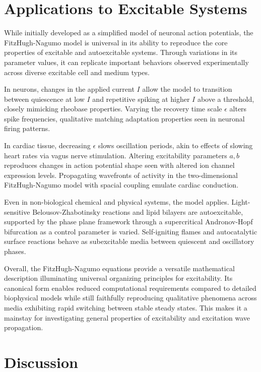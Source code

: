 \section{Applications to Excitable Systems}

While initially developed as a simplified model of neuronal action potentials, the FitzHugh-Nagumo model is universal in its ability to reproduce the core properties of excitable and autoexcitable systems. Through variations in its parameter values, it can replicate important behaviors observed experimentally across diverse excitable cell and medium types.

In neurons, changes in the applied current $I$ allow the model to transition between quiescence at low $I$ and repetitive spiking at higher $I$ above a threshold, closely mimicking rheobase properties. Varying the recovery time scale $\epsilon$ alters spike frequencies, qualitative matching adaptation properties seen in neuronal firing patterns.

In cardiac tissue, decreasing $\epsilon$ slows oscillation periods, akin to effects of slowing heart rates via vagus nerve stimulation. Altering excitability parameters $a,b$ reproduces changes in action potential shape seen with altered ion channel expression levels. Propagating wavefronts of activity in the two-dimensional FitzHugh-Nagumo model with spacial coupling emulate cardiac conduction.

Even in non-biological chemical and physical systems, the model applies. Light-sensitive Belousov-Zhabotinsky reactions and lipid bilayers are autoexcitable, supported by the phase plane framework through a supercritical Andronov-Hopf bifurcation as a control parameter is varied. Self-igniting flames and autocatalytic surface reactions behave as subexcitable media between quiescent and oscillatory phases.

Overall, the FitzHugh-Nagumo equations provide a versatile mathematical description illuminating universal organizing principles for excitability. Its canonical form enables reduced computational requirements compared to detailed biophysical models while still faithfully reproducing qualitative phenomena across media exhibiting rapid switching between stable steady states. This makes it a mainstay for investigating general properties of excitability and excitation wave propagation.

\section{Discussion}

